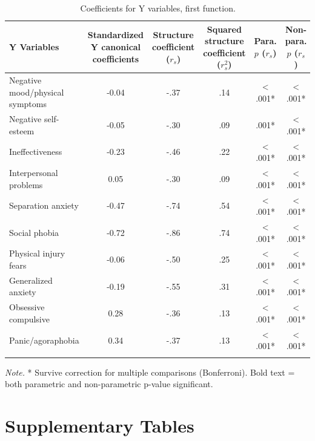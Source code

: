 \documentclass[
  english,
  man,floatsintext]{apa6}
\begin{document}
\begin{table}[tbp]

\begin{center}
\begin{threeparttable}

\caption{\label{tab:coeffytable}Coefficients for Y variables, first function.}

\small{

\begin{tabular}{lccccc}
\toprule
Y Variables & Standardized Y canonical coefficients & Structure coefficient ($r_{s}$) & Squared structure coefficient ($r^{2}_{s}$) & Para. $p$ ($r_{s}$) & Non-para. $p$ ($r_{s}$)\\
\midrule
Negative mood/physical symptoms & -0.04 & -.37 & .14 & < .001* & < .001*\\
Negative self-esteem & -0.05 & -.30 & .09 & .001* & < .001*\\
Ineffectiveness & -0.23 & -.46 & .22 & < .001* & < .001*\\
Interpersonal problems & 0.05 & -.30 & .09 & < .001* & < .001*\\
Separation anxiety & -0.47 & -.74 & .54 & < .001* & < .001*\\
Social phobia & -0.72 & -.86 & .74 & < .001* & < .001*\\
Physical injury fears & -0.06 & -.50 & .25 & < .001* & < .001*\\
Generalized anxiety & -0.19 & -.55 & .31 & < .001* & < .001*\\
Obsessive compulsive & 0.28 & -.36 & .13 & < .001* & < .001*\\
Panic/agoraphobia & 0.34 & -.37 & .13 & < .001* & < .001*\\
\bottomrule
\addlinespace
\end{tabular}

}

\begin{tablenotes}[para]
\normalsize{\textit{Note.} * Survive correction for multiple comparisons (Bonferroni). Bold text = both 
          parametric and non-parametric p-value significant.}
\end{tablenotes}

\end{threeparttable}
\end{center}

\end{table}

\hypertarget{supplementary-tables}{%
\section{Supplementary Tables}\label{supplementary-tables}}
\end{document}
